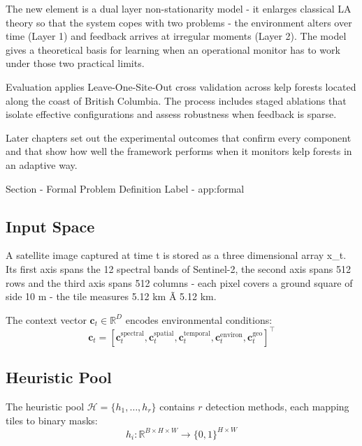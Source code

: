 \documentclass[11pt,a4paper]{article}
\begin{document}
\begin{itemize}
The new element is a dual layer non-stationarity model - it enlarges classical LA theory so that the system copes with two problems - the environment alters over time (Layer 1) and feedback arrives at irregular moments (Layer 2). The model gives a theoretical basis for learning when an operational monitor has to work under those two practical limits.

Evaluation applies Leave-One-Site-Out cross validation across kelp forests located along the coast of British Columbia. The process includes staged ablations that isolate effective configurations and assess robustness when feedback is sparse.

Later chapters set out the experimental outcomes that confirm every component and that show how well the framework performs when it monitors kelp forests in an adaptive way.


\appendix

Section - Formal Problem Definition 
Label - app:formal

\subsection{Input Space}

A satellite image captured at time t is stored as a three dimensional array x_t. Its first axis spans the 12 spectral bands of Sentinel-2, the second axis spans 512 rows and the third axis spans 512 columns - each pixel covers a ground square of side 10 m - the tile measures 5.12 km Ã 5.12 km.

The context vector $\mathbf{c}_t \in \mathbb{R}^D$ encodes environmental conditions:
\begin{equation}
\mathbf{c}_t = \left[ \mathbf{c}^{\text{spectral}}_t, \mathbf{c}^{\text{spatial}}_t, \mathbf{c}^{\text{temporal}}_t, \mathbf{c}^{\text{environ}}_t, \mathbf{c}^{\text{geo}}_t \right]^\top
\end{equation}

\subsection{Heuristic Pool}

The heuristic pool $\mathcal{H} = \{h_1, \ldots, h_r\}$ contains $r$ detection methods, each mapping tiles to binary masks:
\begin{equation}
h_i : \mathbb{R}^{B \times H \times W} \rightarrow \{0, 1\}^{H \times W}
\end{equation}


\end{itemize}
\end{document}
